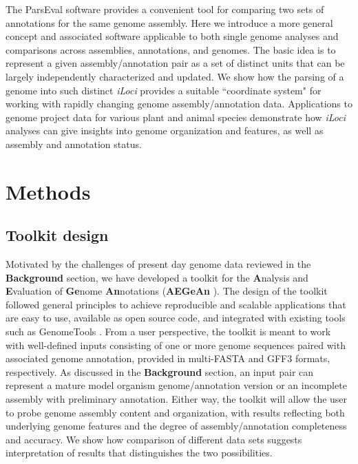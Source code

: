 The ParsEval software \cite{StandageBrendel2012} provides a convenient tool for comparing two sets of annotations for the same genome assembly.
Here we introduce a more general concept and associated software applicable to both single genome analyses and comparisons across assemblies, annotations, and genomes.
The basic idea is to represent a given assembly/annotation pair as a set of distinct units that can be largely independently characterized and updated.
We show how the parsing of a genome into such distinct \textit{iLoci} provides a suitable ``coordinate system" for working with rapidly changing genome assembly/annotation data.
Applications to genome project data for various plant and animal species demonstrate how \textit{iLoci} analyses can give insights into genome organization and features, as well as assembly and annotation status.

\section{Methods}

\subsection{Toolkit design}
Motivated by the challenges of present day genome data reviewed in the \textbf{Background} section, we have developed a toolkit for the \textbf{A}nalysis and \textbf{E}valuation of \textbf{Ge}nome \textbf{An}notations (\textbf{AEGeAn} \cite{AEGeAn}).
The design of the toolkit followed general principles to achieve reproducible and scalable applications that are easy to use, available as open source code, and integrated with existing tools such as GenomeTools \cite{GenomeTools, GenomeToolsWebsite}.
From a user perspective, the toolkit is meant to work with well-defined inputs consisting of one or more genome sequences paired with associated genome annotation, provided in multi-FASTA and GFF3 \cite{GFF3} formats, respectively.
As discussed in the \textbf{Background} section, an input pair can represent a mature model organism genome/annotation version or an incomplete assembly with preliminary annotation.
Either way, the toolkit will allow the user to probe genome assembly content and organization, with results reflecting both underlying genome features and the degree of assembly/annotation completeness and accuracy.
We show how comparison of different data sets suggests interpretation of results that distinguishes the two possibilities.

